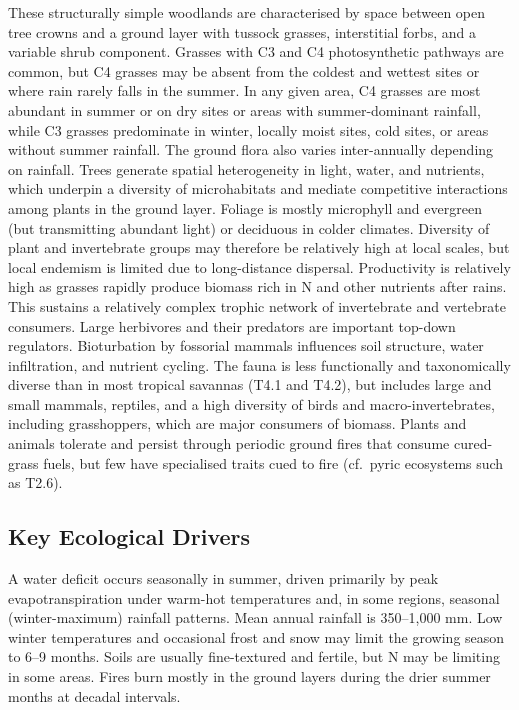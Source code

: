 \documentclass[
  letterpaper,
  DIV=11,
  numbers=noendperiod]{scrartcl}
\begin{document}
These structurally simple woodlands are characterised by space between
open tree crowns and a ground layer with tussock grasses, interstitial
forbs, and a variable shrub component. Grasses with C3 and C4
photosynthetic pathways are common, but C4 grasses may be absent from
the coldest and wettest sites or where rain rarely falls in the summer.
In any given area, C4 grasses are most abundant in summer or on dry
sites or areas with summer-dominant rainfall, while C3 grasses
predominate in winter, locally moist sites, cold sites, or areas without
summer rainfall. The ground flora also varies inter-annually depending
on rainfall. Trees generate spatial heterogeneity in light, water, and
nutrients, which underpin a diversity of microhabitats and mediate
competitive interactions among plants in the ground layer. Foliage is
mostly microphyll and evergreen (but transmitting abundant light) or
deciduous in colder climates. Diversity of plant and invertebrate groups
may therefore be relatively high at local scales, but local endemism is
limited due to long-distance dispersal. Productivity is relatively high
as grasses rapidly produce biomass rich in N and other nutrients after
rains. This sustains a relatively complex trophic network of
invertebrate and vertebrate consumers. Large herbivores and their
predators are important top-down regulators. Bioturbation by fossorial
mammals influences soil structure, water infiltration, and nutrient
cycling. The fauna is less functionally and taxonomically diverse than
in most tropical savannas (T4.1 and T4.2), but includes large and small
mammals, reptiles, and a high diversity of birds and
macro-invertebrates, including grasshoppers, which are major consumers
of biomass. Plants and animals tolerate and persist through periodic
ground fires that consume cured-grass fuels, but few have specialised
traits cued to fire (cf.~pyric ecosystems such as T2.6).

\subsection{Key Ecological Drivers}\label{key-ecological-drivers-86}

A water deficit occurs seasonally in summer, driven primarily by peak
evapotranspiration under warm-hot temperatures and, in some regions,
seasonal (winter-maximum) rainfall patterns. Mean annual rainfall is
350--1,000 mm. Low winter temperatures and occasional frost and snow may
limit the growing season to 6--9 months. Soils are usually fine-textured
and fertile, but N may be limiting in some areas. Fires burn mostly in
the ground layers during the drier summer months at decadal intervals.
\end{document}
